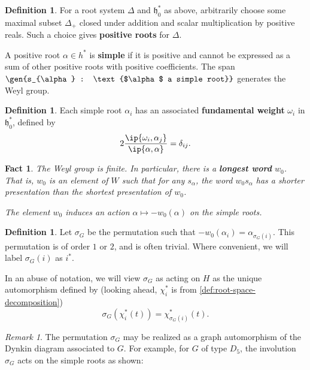 \documentclass{amsart}
\theoremstyle{plain}
\newtheorem{fact}[theorem]{Fact}
\theoremstyle{definition}
\newtheorem{definition}[theorem]{Definition}
\theoremstyle{remark}
\newtheorem{remark}[theorem]{Remark}
\newcommand{\defined}[1]{\textbf{#1}}
\newcommand{\fundamentalweight}{\omega}
\newcommand{\posroots}{\Delta_{+}}
\newcommand{\roots}{\Delta}
\newcommand{\torush}{\chi^{\ast}}
\DeclarePairedDelimiter\gen\langle\rangle
\DeclarePairedDelimiter\ip\langle\rangle
\begin{document}
  \begin{definition}
    For a root system $\roots$ and $\mathfrak{h}_0^{\ast}$ as above,
    arbitrarily choose some maximal subset $\posroots$ closed under
    addition and scalar multiplication by positive reals. Such a choice
    gives \defined{positive roots} for $\roots$.

    A positive root $\alpha \in h^{\ast}$ is \defined{simple} if it is
    positive and cannot be expressed as a sum of other positive roots
    with positive coefficients. The span $\gen{s_{\alpha} :
      \text{$\alpha$ a simple root}}$ generates the Weyl group.
  \end{definition}

  \begin{definition}
    Each simple root $\alpha_{i}$ has an associated \defined{fundamental
      weight} $\fundamentalweight_{i}$ in $\mathfrak{h}_0^{\ast}$,
    defined by \[ 2 \frac{\ip{\fundamentalweight_i,
          \alpha_j}}{\ip{\alpha, \alpha}} = \delta_{ij}. \]
  \end{definition}

  \begin{fact}
    The Weyl group is finite. In particular, there is a \defined{longest
      word} $w_0$. That is, $w_0$ is an element of $W$ such that for any
    $s_{\alpha}$, the word $w_0 s_{\alpha}$ has a shorter presentation
    than the shortest presentation of $w_0$.

    The element $w_0$ induces an action $\alpha \mapsto -w_0(\alpha)$ on
    the simple roots.
  \end{fact}

  \begin{definition}
    \label{def:sigma_G}
    Let $\sigma_G$ be the permutation such that $-w_0(\alpha_i) =
    \alpha_{\sigma_G(i)}$. This permutation is of order $1$ or $2$, and
    is often trivial. Where convenient, we will label $\sigma_G(i)$ as
    $i^{\ast}$.

    In an abuse of notation, we will view $\sigma_G$ as acting on $H$ as
    the unique automorphism defined by (looking ahead, $\torush_{i}$ is
    from \cref{def:root-space-decomposition}) \[
      \sigma_G(\torush_{i}(t)) = \torush_{\sigma_G(i)}(t). \]
  \end{definition}

  \begin{remark}
    \label{rem:sigma_G-action-on-Dynkin-diagram}
    The permutation $\sigma_G$ may be realized as a graph automorphism
    of the Dynkin diagram associated to $G$. For example, for $G$ of
    type $D_5$, the involution $\sigma_G$ acts on the simple roots as
    shown:

    {\centering
      

    }
  \end{remark}
\end{document}
